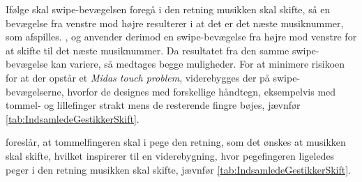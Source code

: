 Ifølge \textcite[s. 166]{PDF:ComparingInputModalities} skal swipe-bevægelsen foregå i den retning musikken skal skifte, så en bevægelse fra venstre mod højre resulterer i at det er det næste musiknummer, som afspilles. \textcite[s. 48]{PDF:UserDefinedGesturesTV}, \textcite{WEB:Beosound2} og \textcite{WEB:BeosoundMoment} anvender derimod en swipe-bevægelse fra højre mod venstre for at skifte til det næste musiknummer. Da resultatet fra den samme swipe-bevægelse kan variere, så medtages begge muligheder. For at minimere risikoen for at der opstår et \textit{Midas touch problem}, viderebygges der på swipe-bevægelserne, hvorfor de designes med forskellige håndtegn, eksempelvis med tommel- og lillefinger strakt mens de resterende fingre bøjes, jævnfør \autoref{tab:IndsamledeGestikkerSkift}.

\textcite[s. 166]{PDF:ComparingInputModalities} foreslår, at tommelfingeren skal i pege den retning, som det ønskes at musikken skal skifte, hvilket inspirerer til en viderebygning, hvor pegefingeren ligeledes peger i den retning musikken skal skifte, jævnfør \autoref{tab:IndsamledeGestikkerSkift}.
\newpage            
%
